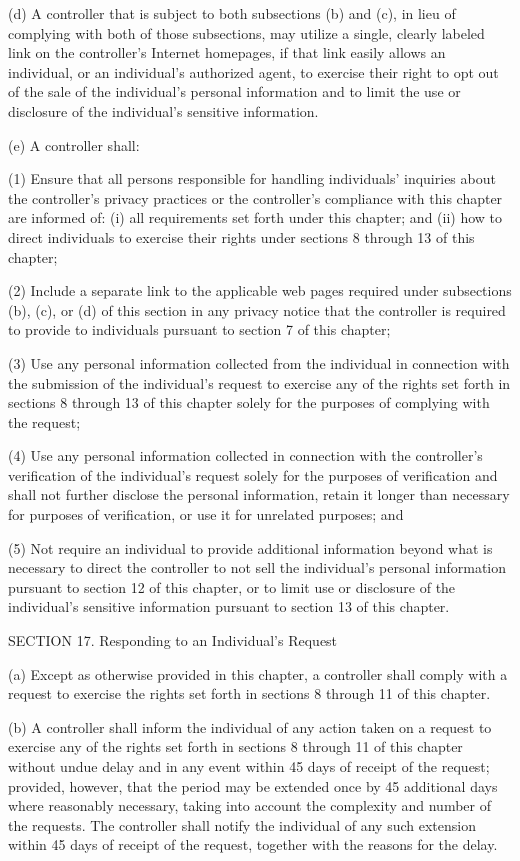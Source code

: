 (d) A controller that is subject to both subsections (b) and (c), in lieu of complying with both of those subsections, may utilize a single, clearly labeled link on the controller’s Internet homepages, if that link easily allows an individual, or an individual’s authorized agent, to exercise their right to opt out of the sale of the individual’s personal information and to limit the use or disclosure of the individual’s sensitive information. 

(e) A controller shall:

(1) Ensure that all persons responsible for handling individuals’ inquiries about the controller’s privacy practices or the controller’s compliance with this chapter are informed of: (i) all requirements set forth under this chapter; and (ii) how to direct individuals to exercise their rights under sections 8 through 13 of this chapter;

(2) Include a separate link to the applicable web pages required under subsections (b), (c), or (d) of this section in any privacy notice that the controller is required to provide to individuals pursuant to section 7 of this chapter;

(3) Use any personal information collected from the individual in connection with the submission of the individual’s request to exercise any of the rights set forth in sections 8 through 13 of this chapter solely for the purposes of complying with the request;

(4) Use any personal information collected in connection with the controller’s verification of the individual’s request solely for the purposes of verification and shall not further disclose the personal information, retain it longer than necessary for purposes of verification, or use it for unrelated purposes; and

(5) Not require an individual to provide additional information beyond what is necessary to direct the controller to not sell the individual’s personal information pursuant to section 12 of this chapter, or to limit use or disclosure of the individual’s sensitive information pursuant to section 13 of this chapter.

SECTION 17. Responding to an Individual’s Request

(a) Except as otherwise provided in this chapter, a controller shall comply with a request to exercise the rights set forth in sections 8 through 11 of this chapter.

(b) A controller shall inform the individual of any action taken on a request to exercise any of the rights set forth in sections 8 through 11 of this chapter without undue delay and in any event within 45 days of receipt of the request; provided, however, that the period may be extended once by 45 additional days where reasonably necessary, taking into account the complexity and number of the requests. The controller shall notify the individual of any such extension within 45 days of receipt of the request, together with the reasons for the delay.

